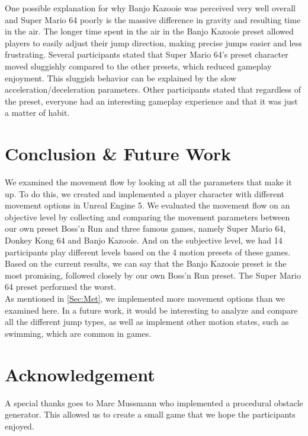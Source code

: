 \documentclass[letterpaper, 10 pt, conference]{ieeeconf}  %
\begin{document}
One possible explanation for why Banjo Kazooie was perceived very well overall and Super Mario 64 poorly is the massive difference in gravity and resulting time in the air.
The longer time spent in the air in the Banjo Kazooie preset allowed players to easily adjust their jump direction, making precise jumps easier and less frustrating.
Several participants stated that Super Mario 64's preset character moved sluggishly compared to the other presets, which reduced gameplay enjoyment.
This sluggish behavior can be explained by the slow acceleration/deceleration parameters.
Other participants stated that regardless of the preset, everyone had an interesting gameplay experience and that it was just a matter of habit.

\section{Conclusion \& Future Work}
\label{Sec:ConcFuture}

We examined the movement flow by looking at all the parameters that make it up.
To do this, we created and implemented a player character with different movement options in Unreal Engine 5.
We evaluated the movement flow on an objective level by collecting and comparing the movement parameters between our own preset Boss'n Run and three famous games, namely Super Mario 64, Donkey Kong 64 and Banjo Kazooie.
And on the subjective level, we had 14 participants play different levels based on the 4 motion presets of these games.
Based on the current results, we can say that the Banjo Kazooie preset is the most promising, followed closely by our own Boss'n Run preset.
The Super Mario 64 preset performed the worst. \\
As mentioned in \ref{Sec:Met}, we implemented more movement options than we examined here. 
In a future work, it would be interesting to analyze and compare all the different jump types, as well as implement other motion states, such as swimming, which are common in games.

\section*{Acknowledgement}

A special thanks goes to Marc Mussmann who implemented a procedural obstacle generator.
This allowed us to create a small game that we hope the participants enjoyed.

\end{document}
